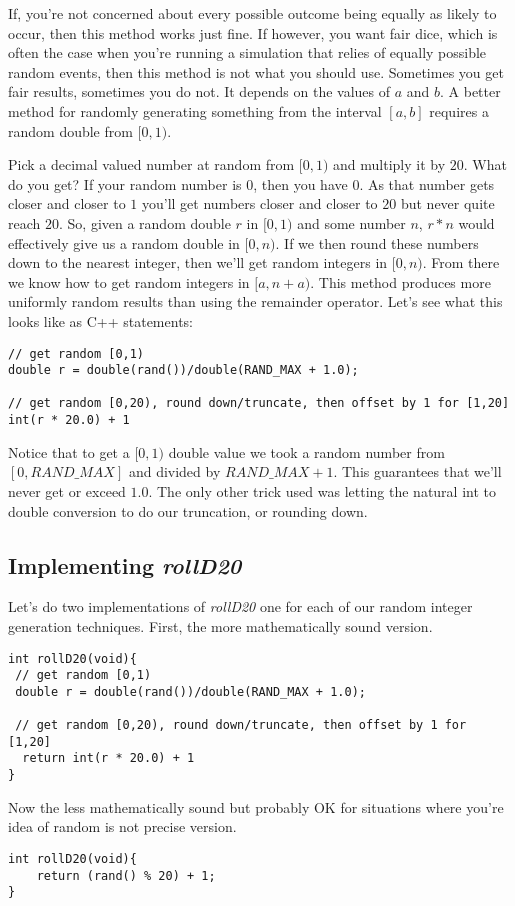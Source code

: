 \documentclass[]{tufte-handout}
\begin{document}
If, you're not concerned about every possible outcome being equally as likely to occur, then this method works just fine. If however, you want fair dice, which is often the case when you're running a simulation that relies of equally possible random events, then this method is not what you should use.  Sometimes you get fair results, sometimes you do not. It depends on the values of $a$ and $b$. A better method for randomly generating something from the interval $[a,b]$ requires a random double  from $[0,1)$. 

Pick a decimal valued number at random from $[0,1)$ and multiply it by $20$. What do you get? If your random number is $0$, then you have $0$. As that number gets closer and closer to $1$ you'll get numbers closer and closer to $20$ but never quite reach $20$. So, given a random double $r$ in $[0,1)$ and some number $n$, $r * n$ would effectively give us a random double in $[0,n)$. If we then round these numbers down to the nearest integer, then we'll get random integers in $[0,n)$. From there we know how to get random integers in $[a,n+a)$. This method produces more uniformly random results than using the remainder operator. Let's see what this looks like as C++ statements:
\begin{verbatim}
// get random [0,1)
double r = double(rand())/double(RAND_MAX + 1.0);

// get random [0,20), round down/truncate, then offset by 1 for [1,20]
int(r * 20.0) + 1
\end{verbatim} 
Notice that to get a $[0,1)$ double value we took a random number from $[0,RAND\_MAX]$ and divided by $RAND\_MAX + 1$. This guarantees that we'll never get or exceed $1.0$.  The only other trick used was letting the natural int to double conversion to do our truncation, or rounding down. 

\subsection{Implementing \textit{rollD20}}

Let's do two implementations of \textit{rollD20} one for each of our random integer generation techniques. First, the more mathematically sound version.
\begin{verbatim}
int rollD20(void){
 // get random [0,1)
 double r = double(rand())/double(RAND_MAX + 1.0);

 // get random [0,20), round down/truncate, then offset by 1 for [1,20]
  return int(r * 20.0) + 1
}
\end{verbatim}
Now the less mathematically sound but probably OK for situations where you're idea of random is not precise version.
\begin{verbatim}
int rollD20(void){
	return (rand() % 20) + 1;
}
\end{verbatim}
\end{document}
